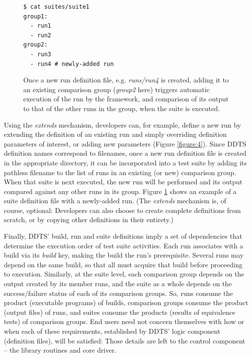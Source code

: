 \documentclass[conference]{IEEEtran}
\begin{document}
\begin{figure}[!t]
{\small \begin{verbatim}
$ cat suites/suite1
group1:
  - run1
  - run2
group2:
  - run3
  - run4 # newly-added run
\end{verbatim} }
\caption{Once a new run definition file, e.g. \emph{runs/run4} is created, adding it to an existing comparison group (\emph{group2} here) triggers automatic execution of the run by the framework, and comparison of its output to that of the other runs in the group, when the suite is executed.}
\label{figure:5}
\end{figure}

Using the \emph{extends} mechanism, developers can, for example, define a new run by extending the definition of an existing run and simply overriding definition parameters of interest, or adding new parameters (Figure \ref{figure:4}). Since DDTS definition names correspond to filenames, once a new run definition file is created in the appropriate directory, it can be incorporated into a test suite by adding its pathless filename to the list of runs in an existing (or new) comparison group. When that suite is next executed, the new run will be performed and its output compared against any other runs in its group. Figure \ref{figure:5} shows an example of a suite definition file with a newly-added run. (The \emph{extends} mechanism is, of course, optional: Developers can also choose to create complete definitions from scratch, or by copying other definitions in their entirety.)

Finally, DDTS' build, run and suite definitions imply a set of dependencies that determine the execution order of test suite activities. Each run associates with a build via its \emph{build} key, making the build the run's prerequisite. Several runs may depend on the same build, so that all must acquire that build before proceeding to execution. Similarly, at the suite level, each comparison group depends on the output created by its member runs, and the suite as a whole depends on the success/failure status of each of its comparison groups. So, runs consume the product (executable programs) of builds, comparison groups consume the product (output files) of runs, and suites consume the products (results of equivalence tests) of comparison groups. End users need not concern themselves with how or when each of these requirements, established by DDTS' logic component (definition files), will be satisfied: Those details are left to the control component -- the library routines and core driver.
\end{document}
